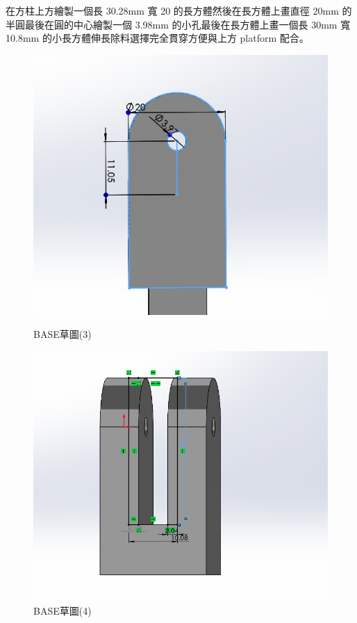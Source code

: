 \newpage

在方柱上方繪製一個長 30.28mm 寬 20 的長方體然後在長方體上畫直徑 20mm 的半圓最後在圓的中心繪製一個 3.98mm 的小孔最後在長方體上畫一個長 30mm 寬 10.8mm 的小長方體伸長除料選擇完全貫穿方便與上方 platform 配合。

\begin{figure}[h!]
    \centering
    \begin{minipage}[b]{0.45\textwidth}
        \centering
        \includegraphics[width=\textwidth]{./../images/6-1-30}
        \caption{BASE草圖(3)}
        \label{fig:platform}
    \end{minipage}
    \hfill
    \begin{minipage}[b]{0.45\textwidth}
        \centering
        \includegraphics[width=\textwidth]{./../images/6-1-31} 
        \caption{BASE草圖(4)}
        \label{fig:feature1}
    \end{minipage}
\end{figure}


